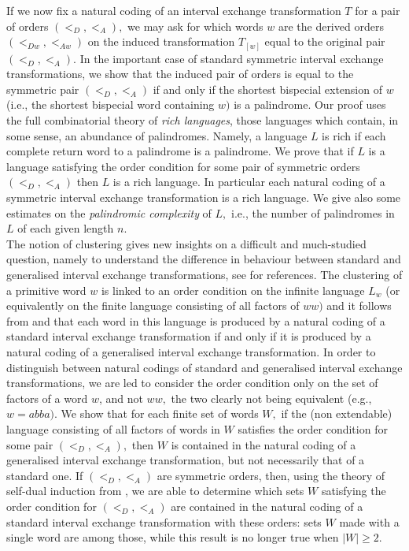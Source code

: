 \documentclass[12pt,a4paper]{amsart}
\begin{document}
   
If we now fix a natural coding of an interval exchange transformation $T$ for a pair of orders $(<_D,<_A),$ we may ask for which words $w$ are the derived orders $(<_{Dw}, <_{Aw})$ on the induced transformation $T_{[w]}$ equal to the original pair $(<_D,<_A).$ 
In the important case of standard symmetric interval exchange transformations, we show that the induced pair of orders is equal to the symmetric pair  $(<_D,<_A)$ if and only if the shortest bispecial extension of $w$ (i.e., the shortest bispecial word containing $w)$ is a palindrome.
Our proof uses the full combinatorial theory of {\it rich languages}, those languages which contain, in some sense, an abundance of palindromes. Namely, a language $L$ is rich if each complete return word to a palindrome is a palindrome. We prove that if $L$ is a language satisfying the order  condition for some pair of symmetric orders $(<_D, <_A)$ then $L$ is a rich language.  In particular each natural coding of a symmetric interval exchange transformation is a rich language. We  give also some estimates on the {\it palindromic complexity} of  $L,$ i.e., the number of palindromes in $L$  of each given length $n.$ \\
  
 The notion of clustering gives new insights on a difficult and much-studied question, namely to understand the difference in behaviour between standard and generalised  interval exchange transformations, see \cite{fhuz} for references. The clustering of a primitive word $w$ is linked to an order condition on the infinite language $L_w$ (or equivalently on the finite language consisting of all  factors of $ww)$ and it follows from \cite{fz4} and  \cite{fz5} that   each word in this language is produced by a natural coding of a standard interval exchange transformation if and only if it is produced by a natural coding of a generalised interval exchange transformation. In order to
 distinguish between natural codings of standard and generalised interval exchange transformations, we are led to consider  the order condition only on the set of factors of a word $w$, and not $ww,$ the two clearly not being equivalent (e.g., $w=abba).$    We show that for each finite set of words $W,$ if the (non extendable) language consisting of all factors of words in $W$ satisfies the order condition  
 for some pair $(<_D,<_A),$ then $W$ is contained in the natural coding of  a generalised interval exchange transformation, but not necessarily that of a standard one. If $(<_D,<_A)$ are symmetric orders, then, using the theory of  self-dual induction from \cite{fz1}, we are able to determine which sets $W$ satisfying the order condition for $(<_D,<_A)$ are contained in the natural coding of a standard interval exchange transformation with these orders: sets $W$ made with a single word are among those, while this result is no longer true when $|W|\geq 2.$
  
\end{document}
